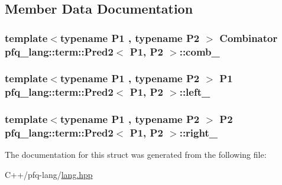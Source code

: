 \subsection{Member Data Documentation}
\hypertarget{structpfq__lang_1_1term_1_1Pred2_a6b0db7f4e7c69fef8112e5b9a65e2af9}{
\subsubsection[{comb\-\_\-}]{\setlength{\rightskip}{0pt plus 5cm}template$<$typename P1 , typename P2 $>$ {\bf Combinator} {\bf pfq\-\_\-lang\-::term\-::\-Pred2}$<$ P1, P2 $>$\-::comb\-\_\-}}\label{structpfq__lang_1_1term_1_1Pred2_a6b0db7f4e7c69fef8112e5b9a65e2af9}
\hypertarget{structpfq__lang_1_1term_1_1Pred2_accc6c58f733abc7027ffde56148dd91e}{
\subsubsection[{left\-\_\-}]{\setlength{\rightskip}{0pt plus 5cm}template$<$typename P1 , typename P2 $>$ P1 {\bf pfq\-\_\-lang\-::term\-::\-Pred2}$<$ P1, P2 $>$\-::left\-\_\-}}\label{structpfq__lang_1_1term_1_1Pred2_accc6c58f733abc7027ffde56148dd91e}
\hypertarget{structpfq__lang_1_1term_1_1Pred2_a0bc158e2c177545dcc9199caab6a4d12}{
\subsubsection[{right\-\_\-}]{\setlength{\rightskip}{0pt plus 5cm}template$<$typename P1 , typename P2 $>$ P2 {\bf pfq\-\_\-lang\-::term\-::\-Pred2}$<$ P1, P2 $>$\-::right\-\_\-}}\label{structpfq__lang_1_1term_1_1Pred2_a0bc158e2c177545dcc9199caab6a4d12}


The documentation for this struct was generated from the following file\-:\begin{DoxyCompactItemize}
\item 
C++/pfq-\/lang/\hyperlink{lang_8hpp}{lang.\-hpp}\end{DoxyCompactItemize}
